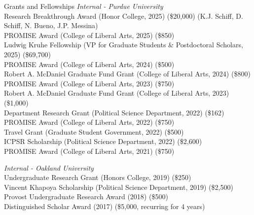 \documentclass{resume} %
\begin{document}
\begin{rSection}{Grants and Fellowships}
{\it Internal - Purdue University}
\\Research Breakthrough Award (Honor College, 2025) (\$20,000) (K.J. Schiff, D. Schiff, N. Bueno, J.P. Messina)
\\PROMISE Award (College of Liberal Arts, 2025) (\$850)
\\Ludwig Kruhe Fellowship (VP for Graduate Students \& Postdoctoral Scholars, 2025) (\$69,700) 
\\PROMISE Award (College of Liberal Arts, 2024) (\$500)
\\Robert A. McDaniel Graduate Fund Grant (College of Liberal Arts, 2024) (\$800)
\\PROMISE Award (College of Liberal Arts, 2023) (\$750)
\\Robert A. McDaniel Graduate Fund Grant (College of Liberal Arts, 2023) (\$1,000)
\\Department Research Grant (Political Science Department, 2022) (\$162)
\\PROMISE Award (College of Liberal Arts, 2022) (\$750)
\\Travel Grant (Graduate Student Government, 2022) (\$500)
\\ICPSR Scholarship (Political Science Department, 2022) (\$2,600)
\\PROMISE Award (College of Liberal Arts, 2021) (\$750)

{\it Internal - Oakland University}
\\Undergraduate Research Grant (Honors College, 2019) (\$250)
\\Vincent Khapoya Scholarship (Political Science Department, 2019) (\$2,500)
\\Provost Undergraduate Research Award (2018) (\$500)
\\Distinguished Scholar Award (2017) (\$5,000, recurring for 4 years)
\end{rSection}

\end{document}
